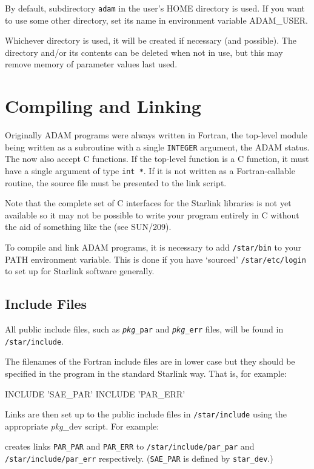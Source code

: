 \documentclass[twoside,11pt,nolof]{starlink}
\begin{document}
By default, subdirectory \texttt{adam} in the user's HOME directory
is used. If you want to use some other directory, set its name in
environment variable ADAM\_USER.

Whichever directory is used, it will be created if necessary (and possible).
The directory and/or its contents can be deleted when not in use, but this
may remove memory of parameter values last used.

\section{Compiling and Linking}
Originally ADAM programs were always written in Fortran, the top-level module
being written as a subroutine with a single \texttt{INTEGER} argument, the
ADAM status.
The
now also accept C functions. If the top-level function is a C function, it
must have a single argument of type \texttt{int *}. If it is not written as a
Fortran-callable routine, the source file must be presented to the link script.

Note that the complete set of C interfaces for the Starlink libraries
is not yet available so it may not be possible to write your program entirely
in C without the aid of something like the
 (see SUN/209).

To compile and link ADAM programs, it is necessary to add \texttt{/star/bin} to
your PATH environment variable. This is done if you have `sourced'
\texttt{/star/etc/login} to set up for Starlink software generally.

\subsection{\label{incs}Include Files}
All public include files, such as \texttt{\textit{pkg}\_par} and
\texttt{\textit{pkg}\_err} files, will be found in \texttt{/star/include}.

The filenames of the Fortran include files are in lower case but they should
be specified in the program in the standard Starlink way. That is, for example:
\begin{terminalv}
INCLUDE 'SAE_PAR'
INCLUDE 'PAR_ERR'
\end{terminalv}
Links are then set up to the public include files in \texttt{/star/include}
using the appropriate \textit{pkg}\_dev script.
For example:
\begin{terminalv}
\end{terminalv}
creates links \texttt{PAR\_PAR} and \texttt{PAR\_ERR} to
\texttt{/star/include/par\_par} and \texttt{/star/include/par\_err}
respectively.
(\texttt{SAE\_PAR} is defined by \texttt{star\_dev}.)
\end{document}
